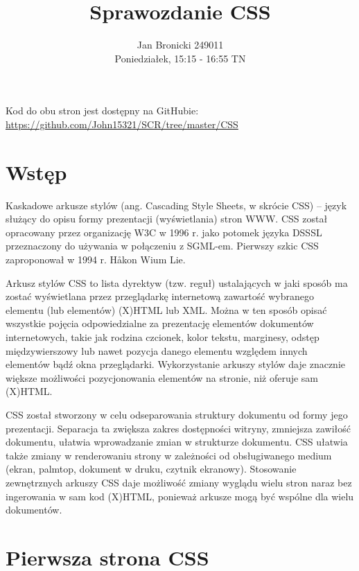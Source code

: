 \documentclass{article}
\title{Sprawozdanie CSS}
\author{Jan Bronicki 249011\\Poniedziałek, 15:15 - 16:55 TN}
\date{}
\begin{document}
\maketitle

\begin{center}
    Kod do obu stron jest dostępny na GitHubie:
    \url{https://github.com/John15321/SCR/tree/master/CSS}
\end{center}

\section{Wstęp}
Kaskadowe arkusze stylów (ang. Cascading Style Sheets, w skrócie CSS) – język służący do opisu formy prezentacji (wyświetlania) stron WWW. CSS został opracowany przez organizację W3C w 1996 r. jako potomek języka DSSSL przeznaczony do używania w połączeniu z SGML-em. Pierwszy szkic CSS zaproponował w 1994 r. Håkon Wium Lie.

Arkusz stylów CSS to lista dyrektyw (tzw. reguł) ustalających w jaki sposób ma zostać wyświetlana przez przeglądarkę internetową zawartość wybranego elementu (lub elementów) (X)HTML lub XML. Można w ten sposób opisać wszystkie pojęcia odpowiedzialne za prezentację elementów dokumentów internetowych, takie jak rodzina czcionek, kolor tekstu, marginesy, odstęp międzywierszowy lub nawet pozycja danego elementu względem innych elementów bądź okna przeglądarki. Wykorzystanie arkuszy stylów daje znacznie większe możliwości pozycjonowania elementów na stronie, niż oferuje sam (X)HTML.

CSS został stworzony w celu odseparowania struktury dokumentu od formy jego prezentacji. Separacja ta zwiększa zakres dostępności witryny, zmniejsza zawiłość dokumentu, ułatwia wprowadzanie zmian w strukturze dokumentu. CSS ułatwia także zmiany w renderowaniu strony w zależności od obsługiwanego medium (ekran, palmtop, dokument w druku, czytnik ekranowy). Stosowanie zewnętrznych arkuszy CSS daje możliwość zmiany wyglądu wielu stron naraz bez ingerowania w sam kod (X)HTML, ponieważ arkusze mogą być wspólne dla wielu dokumentów.


\newpage
\section{Pierwsza strona CSS}
\end{document}
